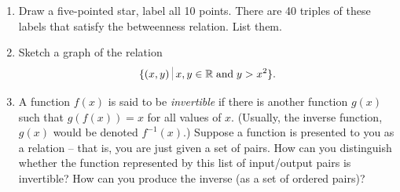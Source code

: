 \begin{enumerate}
\vfill


\vfill

\hintspagebreak
\workbookpagebreak

\item Draw a five-pointed star, label all 10 points. There are 40 triples of these 
labels that satisfy the betweenness relation.  List them.

\vfill


\workbookpagebreak

\item Sketch a graph of the relation 
\[
\{ (x,y) \suchthat x,y \in \Reals \; \mbox{and} \; y > x^2 \}.
\]


\wbvfill

\item A function $f(x)$ is said to be  
\emph{invertible} if there is another function $g(x)$ such that 
$g(f(x)) = x$ for all values of $x$.  (Usually, the inverse function,
$g(x)$ would be denoted $f^{-1}(x)$.)   Suppose a function is presented 
to you as a relation -- that is, you are just given a set of pairs.  
How can you distinguish whether the function represented by this list 
of input/output pairs is invertible?  How can you produce the inverse 
(as a set of ordered pairs)?
 

\end{enumerate}
